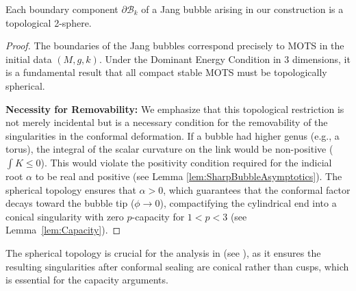 \begin{proposition}\label{prop:BubbleTopology}
Each boundary component $\partial\mathcal{B}_k$ of a Jang bubble arising in our construction is a topological 2-sphere.
\end{proposition}
\begin{proof}
The boundaries of the Jang bubbles correspond precisely to MOTS in the initial data $(M,g,k)$. Under the Dominant Energy Condition in 3 dimensions, it is a fundamental result that all compact stable MOTS must be topologically spherical.

\textbf{Necessity for Removability:}
We emphasize that this topological restriction is not merely incidental but is a necessary condition for the removability of the singularities in the conformal deformation. If a bubble had higher genus (e.g., a torus), the integral of the scalar curvature on the link would be non-positive ($\int K \le 0$). This would violate the positivity condition required for the indicial root $\alpha$ to be real and positive (see Lemma \ref{lem:SharpBubbleAsymptotics}). The spherical topology ensures that $\alpha > 0$, which guarantees that the conformal factor decays toward the bubble tip ($\phi \to 0$), compactifying the cylindrical end into a conical singularity with zero $p$-capacity for $1 < p < 3$ (see Lemma~\ref{lem:Capacity}).
\end{proof}

\begin{remark}
The spherical topology is crucial for the analysis in  (see ), as it ensures the resulting singularities after conformal sealing are conical rather than cusps, which is essential for the capacity arguments.
\end{remark}
